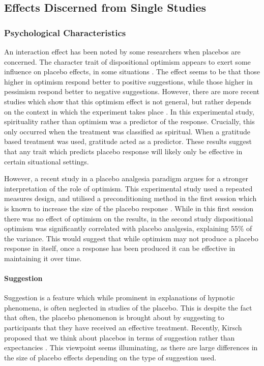 \subsection{Effects Discerned from Single Studies}
\label{sec:effects-disc-from}
\subsubsection{Psychological Characteristics}
\label{sec:psych-char}
An interaction effect has been noted by some researchers when placebos are concerned. The character trait of dispositional optimism appears to exert some influence on placebo effects, in some situations \cite{Geers2005,morton2009reproducibility}. The effect seems to be that those higher in optimism respond better to positive suggestions, while those higher in pessimism respond better to negative suggestions. However, there are more recent studies which show that this optimism effect is not general, but rather depends on the context in which the experiment takes place \cite{Hyland2006}. In this experimental study, spirituality rather than optimism was a predictor of the response. Crucially, this only occurred when the treatment was classified as spiritual. When a gratitude based treatment was used, gratitude acted as a predictor. These results suggest that any trait which predicts placebo response will likely only be effective in certain situational settings. 

However, a recent study \cite{morton2009reproducibility} in a placebo analgesia paradigm argues for a stronger interpretation of the role of optimism. This experimental study used a repeated measures design, and utilised a preconditioning method in the first session which is known to increase the size of the placebo response \cite{Voudouris1985}. While in this first session there was no effect of optimism on the results, in the second study dispositional optimism was significantly correlated with placebo analgesia, explaining 55\% of the variance. This would suggest that while optimism may not produce a placebo response in itself, once a response has been produced it can be effective in maintaining it over time. 

\paragraph{Suggestion} 

Suggestion is a feature which while prominent in explanations of hypnotic phenomena, is often neglected in studies of the placebo. This is despite the fact that often, the placebo phenomenon is brought about by suggesting to participants that they have received an effective treatment. Recently, Kirsch proposed that we think about placebos in terms of suggestion rather than expectancies  \cite{Kirsch1999}. This viewpoint seems illuminating, as there are large differences in the size of placebo effects depending on the type of suggestion used. 

